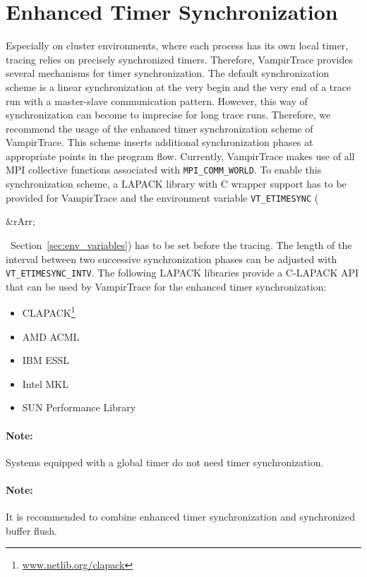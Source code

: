 \documentclass[a4paper,twoside,12pt,BCOR12mm]{scrbook}
\newcommand{\rarr}{$\Rightarrow$}  %
\renewcommand{\rarr}{\begin{rawhtml}&rArr;\end{rawhtml}}   %
\begin{document}
\section{Enhanced Timer Synchronization}
\label{sec:timer_synchronization}

Especially on cluster environments, where each process has its own local timer,
tracing relies on precisely synchronized timers. Therefore, VampirTrace provides
several mechanisms for timer synchronization. The default synchronization scheme is a
linear synchronization at the very begin and the very end of a trace run with a
master-slave communication pattern. \newline
However, this way of synchronization can become to imprecise for long trace runs.
Therefore, we recommend the usage of the enhanced timer synchronization scheme of 
VampirTrace. This scheme inserts additional synchronization phases at appropriate
points in the program flow. Currently, VampirTrace makes use of all MPI collective
functions associated with \texttt{MPI\_COMM\_WORLD}.\newline
To enable this synchronization scheme, a LAPACK library with C wrapper support has to be 
provided for VampirTrace and the environment variable \latex{\\} 
\texttt{VT\_ETIMESYNC} (\rarr\ Section~\ref{sec:env_variables})
has to be set before the tracing.\newline
The length of the interval between two successive synchronization phases can be 
adjusted with \texttt{VT\_ETIMESYNC\_INTV}.\newline
The following LAPACK libraries provide a C-LAPACK API that can be used by VampirTrace
for the enhanced timer synchronization:
\begin{itemize}
 \item CLAPACK\footnote{\url{www.netlib.org/clapack} }
 \item AMD ACML
 \item IBM ESSL
 \item Intel MKL
 \item SUN Performance Library
\end{itemize}

  \paragraph{Note:}
  Systems equipped with a global timer do not need timer synchronization.

  \paragraph{Note:}
  It is recommended to combine enhanced timer synchronization and synchronized buffer flush.
\end{document}
